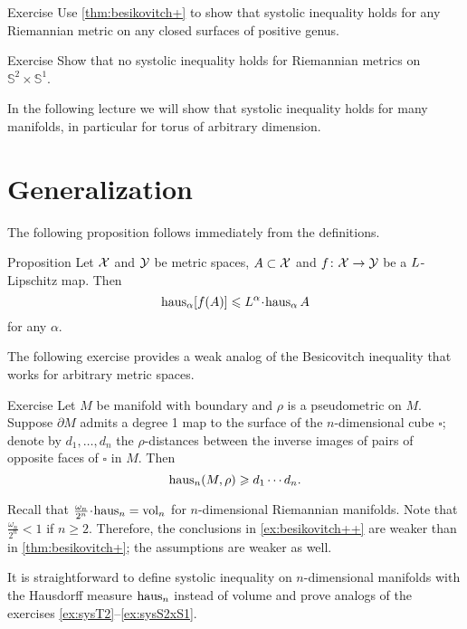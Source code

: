 \begin{thm}{Exercise}\label{ex:sysSg}
Use \ref{thm:besikovitch+} to show that systolic inequality holds for any Riemannian metric on any closed surfaces of positive genus.
\end{thm}

\begin{thm}{Exercise}\label{ex:sysS2xS1}
Show that no systolic inequality holds for Riemannian metrics on $\mathbb{S}^2\times\mathbb{S}^1$.
\end{thm}

In the following lecture we will show that systolic inequality holds for many manifolds, in particular for torus of arbitrary dimension.

\section{Generalization}\label{sec:hausdorff-measure}

The following proposition follows immediately from the definitions.

\begin{thm}{Proposition}\label{prop:bilip-measure}
Let $\mathcal{X}$ and $\mathcal{Y}$ be metric spaces, $A\subset \mathcal{X}$
and
 $f\colon \mathcal{X}\to \mathcal{Y}$ be a $L$-Lipschitz map. 
Then 
\[\haus_\alpha [f(A)]\le \Lip^\alpha\cdot\haus_\alpha\, A\]
for any $\alpha$.
\end{thm}

The following exercise provides a weak analog of the Besicovitch inequality that works for arbitrary metric spaces.

\begin{thm}{Exercise}\label{ex:besikovitch++}
Let $M$ be manifold with boundary and $\rho$ is a pseudometric on $M$.
Suppose $\partial M$ admits a degree 1 map to the surface of the $n$-dimensional cube $\square$;
denote by $d_1,\dots, d_n$ the $\rho$-distances between the inverse images of pairs of opposite faces of $\square$ in $M$.
Then 
\[\mathrm{haus}_n(M,\rho)\geqslant d_1\cdots d_n.\]
\end{thm}


Recall that $\tfrac{\omega_n}{2^n}\cdot\haus_n=\vol_n$ for $n$-dimensional Riemannian manifolds.
Note that $\tfrac{\omega_n}{2^n}<1$ if $n\ge 2$.
Therefore, the conclusions in \ref{ex:besikovitch++} are weaker than in \ref{thm:besikovitch+}; the assumptions are weaker as well.

It is straightforward to define systolic inequality on $n$-dimensional manifolds with the Hausdorff measure $\mathrm{haus}_n$ instead of volume and prove analogs of the exercises \ref{ex:sysT2}--\ref{ex:sysS2xS1}.

